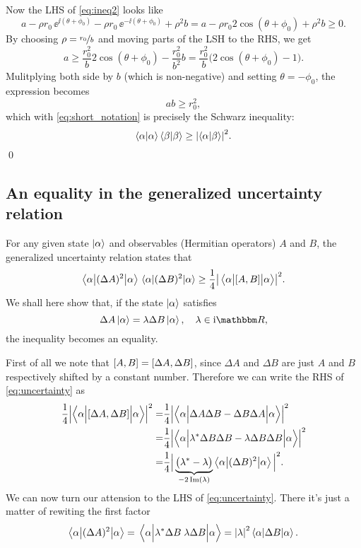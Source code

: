 \documentclass[11pt,letter, swedish, english
]{article}
\begin{document}
Now the LHS of \eqref{eq:ineq2} looks like
\begin{equation}
a -\rho r_0\,\ee^{\ii(\theta + \phi_0)} 
-\rho r_0\,\ee^{-\ii(\theta+\phi_0)} + \rho^2b 
= a - \rho r_0 2\cos(\theta+\phi_0) + \rho^2b \ge 0.
\end{equation}
By choosing $\rho=\nicefrac{r_0}{b}$ and moving parts of the LSH to
the RHS, we get
\begin{equation}
a \ge  \frac{r_0^2}{b} 2\cos(\theta+\phi_0) - \frac{r_0^2}{b^2}b 
= \frac{r_0^2}{b} \Big( 2\cos(\theta+\phi_0) - 1 \Big).
\end{equation}
Mulitplying both side by $b$ (which is non-negative) and setting
$\theta=-\phi_0$, the expression becomes
\begin{equation}
ab \ge r_0^2,
\end{equation}
which with \eqref{eq:short_notation} is precisely the Schwarz
inequality:
\begin{equation}
\braket{\alpha}\braket{\beta} \ge \abs{\braket{\alpha}{\beta}}^2.
\end{equation}
\qed

\subsection{An equality in the generalized uncertainty relation}
For any given state $\ket{\alpha}$ and observables (Hermitian
operators) $A$ and $B$, the generalized uncertainty relation states that
\begin{equation} \label{eq:uncertainty}
\ev**{(\Delta{A})^2}{\alpha}\ev{(\Delta{B})^2}{\alpha} 
\ge \frac{1}{4} \abs{\ev{\comm{A}{B}}{\big.\alpha}}^2.
\end{equation}
We shall here show that, if the state $\ket{\alpha}$ satisfies
\begin{equation}
\Delta{A}\ket{\alpha}=\lambda \Delta{B}\ket{\alpha}\qcomma \lambda \in \ii\R,
\end{equation}
the inequality becomes an equality.

First of all we note that $\comm{A}{B}=\comm{\Delta{A}}{\Delta{B}}$,
since $\Delta{A}$ and $\Delta{B}$ are just $A$ and $B$ respectively
shifted by a constant number. Therefore we can write the RHS of
\eqref{eq:uncertainty} as
\begin{equation}
\begin{aligned}
\frac{1}{4} \abs{\ev**{\comm{\Delta{A}}{\Delta{B}}}{\Big.\alpha}}^2 
=& \frac{1}{4} 
  \abs{\ev**{\Delta{A}\Delta{B} -\Delta{B}\Delta{A}}{\Big.\alpha}}^2 \\
=& \frac{1}{4} \abs{
    \ev**{\lambda^*\Delta{B}\Delta{B} - \lambda\Delta{B}\Delta{B}}{\Big.\alpha}
   }^2\\
=& \frac{1}{4} \Big| \underbrace{\big(\lambda^*-\lambda\big)}_{-2\Im(\lambda)}
\ev**{(\Delta{B})^2}{\alpha} \Big|^2.
\end{aligned}
\end{equation}
We can now turn our attension to the LHS of
\eqref{eq:uncertainty}. There it's just a matter of rewiting the first
factor
\begin{equation}
\ev**{(\Delta{A})^2}{\alpha} 
= \ev{\lambda^*\Delta{B}\;\lambda\Delta{B}}{\Big.\alpha} 
= \abs{\lambda}^2 \ev{\Delta{B}}{\alpha}.
\end{equation}
\end{document}
